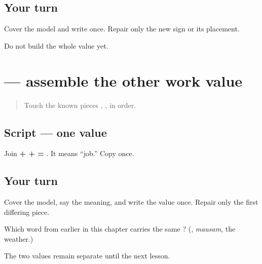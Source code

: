 \subsection*{Your turn}
Cover the model and write \textbf{} once. Repair only the new sign or its placement.

\begin{tcolorbox}[breakable,colback=teal!4,colframe=teal!35!black,title={Before you move on}]
Do not build the whole value yet.
\end{tcolorbox}
\section[\texorpdfstring{\pa{ਨੌਕਰੀ} (naukarī)}{ਨੌਕਰੀ (naukarī)}]{ — assemble the other work value}

\label{lesson:PA-W05-job}



\begin{quote}
Touch the known pieces \textbf{}, \textbf{}, \textbf{} in order.
\end{quote}

\subsection*{Script — one value}
Join \textbf{ +  +  = }. It means “job.” Copy \textbf{} once.

\subsection*{Your turn}
Cover the model, say the meaning, and write the value once. Repair only the first differing piece.

\begin{tcolorbox}[breakable,colback=teal!4,colframe=teal!35!black,title={Before you move on}]
Which word from earlier in this chapter carries the same ? (\textbf{}, \emph{mausam}, the weather.)

The two values remain separate until the next lesson.
\end{tcolorbox}
